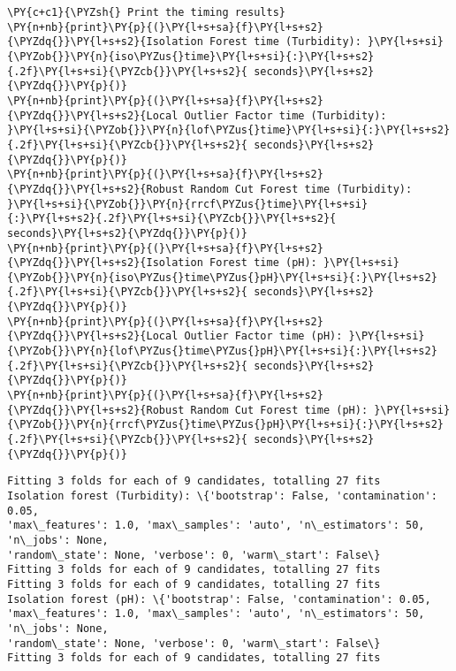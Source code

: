 \begin{tcolorbox}[breakable, size=fbox, boxrule=1pt, pad at break*=1mm,colback=cellbackground, colframe=cellborder]
\begin{Verbatim}[commandchars=\\\{\}]
\PY{c+c1}{\PYZsh{} Print the timing results}
\PY{n+nb}{print}\PY{p}{(}\PY{l+s+sa}{f}\PY{l+s+s2}{\PYZdq{}}\PY{l+s+s2}{Isolation Forest time (Turbidity): }\PY{l+s+si}{\PYZob{}}\PY{n}{iso\PYZus{}time}\PY{l+s+si}{:}\PY{l+s+s2}{.2f}\PY{l+s+si}{\PYZcb{}}\PY{l+s+s2}{ seconds}\PY{l+s+s2}{\PYZdq{}}\PY{p}{)}
\PY{n+nb}{print}\PY{p}{(}\PY{l+s+sa}{f}\PY{l+s+s2}{\PYZdq{}}\PY{l+s+s2}{Local Outlier Factor time (Turbidity): }\PY{l+s+si}{\PYZob{}}\PY{n}{lof\PYZus{}time}\PY{l+s+si}{:}\PY{l+s+s2}{.2f}\PY{l+s+si}{\PYZcb{}}\PY{l+s+s2}{ seconds}\PY{l+s+s2}{\PYZdq{}}\PY{p}{)}
\PY{n+nb}{print}\PY{p}{(}\PY{l+s+sa}{f}\PY{l+s+s2}{\PYZdq{}}\PY{l+s+s2}{Robust Random Cut Forest time (Turbidity): }\PY{l+s+si}{\PYZob{}}\PY{n}{rrcf\PYZus{}time}\PY{l+s+si}{:}\PY{l+s+s2}{.2f}\PY{l+s+si}{\PYZcb{}}\PY{l+s+s2}{ seconds}\PY{l+s+s2}{\PYZdq{}}\PY{p}{)}
\PY{n+nb}{print}\PY{p}{(}\PY{l+s+sa}{f}\PY{l+s+s2}{\PYZdq{}}\PY{l+s+s2}{Isolation Forest time (pH): }\PY{l+s+si}{\PYZob{}}\PY{n}{iso\PYZus{}time\PYZus{}pH}\PY{l+s+si}{:}\PY{l+s+s2}{.2f}\PY{l+s+si}{\PYZcb{}}\PY{l+s+s2}{ seconds}\PY{l+s+s2}{\PYZdq{}}\PY{p}{)}
\PY{n+nb}{print}\PY{p}{(}\PY{l+s+sa}{f}\PY{l+s+s2}{\PYZdq{}}\PY{l+s+s2}{Local Outlier Factor time (pH): }\PY{l+s+si}{\PYZob{}}\PY{n}{lof\PYZus{}time\PYZus{}pH}\PY{l+s+si}{:}\PY{l+s+s2}{.2f}\PY{l+s+si}{\PYZcb{}}\PY{l+s+s2}{ seconds}\PY{l+s+s2}{\PYZdq{}}\PY{p}{)}
\PY{n+nb}{print}\PY{p}{(}\PY{l+s+sa}{f}\PY{l+s+s2}{\PYZdq{}}\PY{l+s+s2}{Robust Random Cut Forest time (pH): }\PY{l+s+si}{\PYZob{}}\PY{n}{rrcf\PYZus{}time\PYZus{}pH}\PY{l+s+si}{:}\PY{l+s+s2}{.2f}\PY{l+s+si}{\PYZcb{}}\PY{l+s+s2}{ seconds}\PY{l+s+s2}{\PYZdq{}}\PY{p}{)}
\end{Verbatim}
\end{tcolorbox}

    \begin{Verbatim}[commandchars=\\\{\}]
Fitting 3 folds for each of 9 candidates, totalling 27 fits
Isolation forest (Turbidity): \{'bootstrap': False, 'contamination': 0.05,
'max\_features': 1.0, 'max\_samples': 'auto', 'n\_estimators': 50, 'n\_jobs': None,
'random\_state': None, 'verbose': 0, 'warm\_start': False\}
Fitting 3 folds for each of 9 candidates, totalling 27 fits
Fitting 3 folds for each of 9 candidates, totalling 27 fits
Isolation forest (pH): \{'bootstrap': False, 'contamination': 0.05,
'max\_features': 1.0, 'max\_samples': 'auto', 'n\_estimators': 50, 'n\_jobs': None,
'random\_state': None, 'verbose': 0, 'warm\_start': False\}
Fitting 3 folds for each of 9 candidates, totalling 27 fits
    \end{Verbatim}

